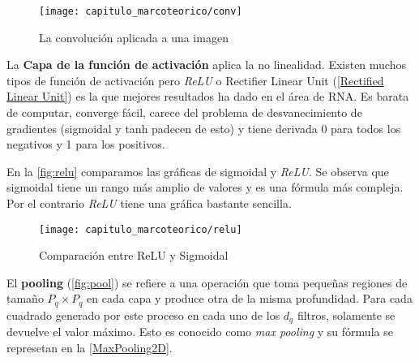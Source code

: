 

\begin{figure}[H]
    \centering
    \texttt{[image: capitulo\_marcoteorico/conv]}
    \caption{La convolución aplicada a una imagen}\label{fig:conv}
\end{figure}

La \textbf{Capa de la función de activación} aplica la no linealidad. Existen
muchos tipos de función de activación pero \emph{ReLU} o Rectifier Linear Unit
(\autoref{Rectified Linear Unit}) es la que mejores resultados ha dado en el
área de RNA. Es barata de computar, converge fácil, carece del problema de
desvanecimiento de gradientes (sigmoidal y tanh padecen de esto) y tiene
derivada 0 para todos los negativos y 1 para los positivos.



En la \autoref{fig:relu} comparamos las gráficas de sigmoidal y \emph{ReLU}. Se
observa que sigmoidal tiene un rango más amplio de valores y es una fórmula más
compleja. Por el contrario \emph{ReLU} tiene una gráfica bastante sencilla.

\begin{figure}[H]
    \centering
    \texttt{[image: capitulo\_marcoteorico/relu]}
    \caption{Comparación entre ReLU y Sigmoidal}\label{fig:relu}
\end{figure}

El \textbf{pooling} (\autoref{fig:pool}) se refiere a una operación que toma
pequeñas regiones de tamaño \(P_{q} \times P_{q}\) en cada capa y produce otra
de la misma profundidad. Para cada cuadrado generado por este proceso en cada
uno de los \(d_{q}\) filtros, solamente se devuelve el valor máximo. Esto es
conocido como \emph{max pooling} y su fórmula se represetan en la
\autoref{MaxPooling2D}.

